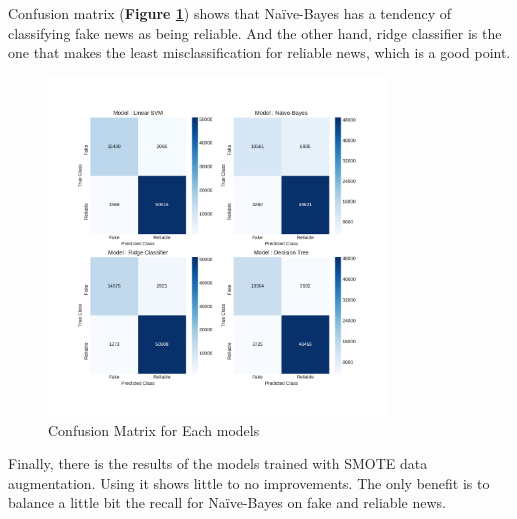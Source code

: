 Confusion matrix (\textbf{Figure \ref{fig:chap3:confMat2}}) shows that Na\"{i}ve-Bayes has a tendency of classifying fake news as being reliable. And the other hand, ridge classifier is the one that makes the least misclassification for reliable news, which is a good point. \\
\begin{figure}
 \centering
 \includegraphics[width=0.8\textwidth]{images/chapitre3/test_fake_confMat}
 \caption{Confusion Matrix for Each models}
 \label{fig:chap3:confMat2}
\end{figure}
Finally, there is the results of the models trained with SMOTE data augmentation. Using it shows little to no improvements. The only benefit is to balance a little bit the recall for Na\"{i}ve-Bayes on fake and reliable news. 
